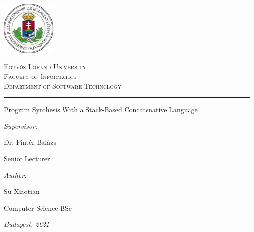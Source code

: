 \begin{titlepage}

\noindent
\parbox[m]{0.2\textwidth}{
 \includegraphics[width=0.2\textwidth]{elte_logo.eps}
}
\hfill
\parbox[m]{0.7\textwidth}{
    \begin{center}
        \begin{large}
        \textsc{
            E\"{o}tv\"{o}s Lor\'{a}nd University\\
            \vspace{0.5pc}
            Faculty of Informatics\\
            \vspace{0.5pc}
            Department of Software Technology\\
        }
        \end{large}
    \end{center}
}

\vspace{1pc}
\hrule

\vfill

\begin{center}
{\LARGE Program Synthesis With a Stack-Based Concatenative Language}
\end{center}

\vfill

\noindent
\hspace*{0.05\textwidth}
\parbox{0.45\textwidth}{
    {\it Supervisor:}
    \bigskip
    
    {\Large Dr. Pint\'er Bal\'azs}
    \smallskip
    
    Senior Lecturer
}
\hfill
\parbox{0.45\textwidth}{
    {\it Author:}
    \bigskip
    
    {\Large Su Xiaotian}
    \smallskip
    
    Computer Science BSc
}


\vfill

\begin{center}
{\large {\it Budapest, 2021}}
\end{center}

\end{titlepage}


